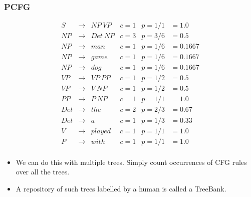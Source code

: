 \begin{frame}
\frametitle{PCFG}
{\small
\[
\begin{array}{ccccll}
 S & \rightarrow & NP~VP  & c=1 & p = 1/1 & = 1.0 \\
 NP & \rightarrow & Det~NP & c=3 & p = 3/6 & = 0.5 \\
 NP & \rightarrow & man  & c=1 & p = 1/6 & = 0.1667 \\
 NP & \rightarrow & game  & c=1 & p = 1/6 & = 0.1667 \\
 NP & \rightarrow & dog  & c=1 & p = 1/6 & = 0.1667 \\
 VP & \rightarrow & VP~PP  & c=1 & p = 1/2 & = 0.5 \\
 VP & \rightarrow & V~NP  & c=1 & p = 1/2 & = 0.5 \\
 PP & \rightarrow & P~NP  & c=1 & p = 1/1 & = 1.0 \\
 Det & \rightarrow & the  & c=2 & p = 2/3 & = 0.67 \\
 Det & \rightarrow & a  & c=1 & p = 1/3 & = 0.33 \\
 V & \rightarrow & played & c=1 & p = 1/1 & = 1.0 \\
 P & \rightarrow & with & c=1 & p = 1/1 & = 1.0 \\
\end{array}
\] 
}
\begin{itemize}
\item We can do this with multiple trees. Simply count occurrences of CFG rules over all the trees. 
\item A repository of such trees labelled by a human is called a TreeBank.
\end{itemize}
\end{frame}


